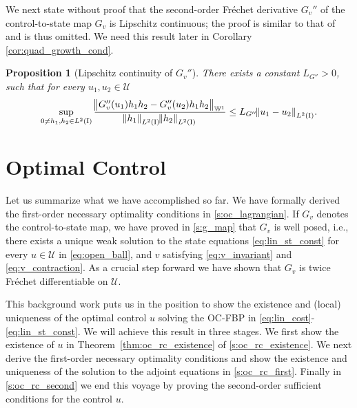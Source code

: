 \documentclass[final]{siamltex}
\newtheorem{prop}[theorem]{Proposition}
\begin{document}
We next state without proof that the second-order Fr\'echet 
derivative $G_v''$ of the control-to-state map $G_v$
is Lipschitz continuous; the proof is similar to that of
 and is thus omitted. We need this result
later in Corollary \ref{cor:quad_growth_cond}.
\begin{prop}[Lipschitz continuity of $G_v''$]\label{prop:guu_Lipschitz} There exists a constant 
$L_{G''} > 0$, such that for every $u_1, u_2 \in {\mathcal{U}}$
	\begin{equation}\label{eq:guu_Lipschitz}
		\sup_{0\neq h_1,h_2 \in L^2({\text{\rm I}})}\frac{\norm{G''_v(u_1)h_1 h_2 - G''_v(u_2)h_1h_2}_{{\mathbb{W}}^1}}{{\norm{{h_1}}_{{L^2\del{{{\text{\rm I}}}}}}}{\norm{{h_2}}_{{L^2\del{{{\text{\rm I}}}}}}}} \leq L_{G''}{\norm{{u_1-u_2}}_{{L^2\del{{{\text{\rm I}}}}}}}.
	\end{equation}
\end{prop}

\section{Optimal Control} \label{s:oc_rc}
Let us summarize what we have accomplished so far. We have formally derived the 
first-order necessary optimality conditions in \autoref{s:oc_lagrangian}. If 
$G_v$ denotes the control-to-state map, we have proved in \autoref{s:g_map} that
$G_v$ is well posed, i.e., there exists a unique weak solution to the state equations 
\eqref{eq:lin_st_const} for every $u\in {\mathcal{U}}$ in \eqref{eq:open_ball}, and $v$ satisfying \eqref{eq:v_invariant}
and \eqref{eq:v_contraction}. As a crucial step forward we 
have shown that 
$G_v$ is twice Fr\'echet differentiable on ${\mathcal{U}}$. 

This background work puts us in the position to show the existence and (local)
uniqueness of the optimal control $u$ solving the OC-FBP in \eqref{eq:lin_cost}-\eqref{eq:lin_st_const}.
We will achieve this result in three stages. We first show the existence of $u$ in 
Theorem~\ref{thm:oc_rc_existence} of \autoref{s:oc_rc_existence}. We next derive 
the first-order necessary optimality conditions and show the existence and uniqueness of the solution to the 
adjoint equations in \autoref{s:oc_rc_first}. Finally in \autoref{s:oc_rc_second} 
we end this voyage by proving the second-order sufficient conditions for the control $u$. 
\end{document}
